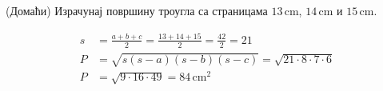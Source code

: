 \documentclass[11pt,a5paper,twoside,addpoints,answers]{exam} %
\newcommand{\measure}[2]{\mathrm{#1\,#2}}
\newcommand{\variant}[3]{#1}
\begin{document}
\begin{questions}
\question[5]
(Домаћи) Израчунај површину троугла са страницама
$\measure{\variant{13}{10}{9}}{cm}$,
$\measure{\variant{14}{15}{10}}{cm}$ и
$\measure{\variant{15}{7}{15}}{cm}$.
\begin{solution}[\stretch 5]
\begin{align*}
s &= \frac{a+b+c}{2}
= \frac{\variant{13+14+15}{10+15+7}{9+10+15}}{2}
= \frac{\variant{42}{32}{34}}{2} = \variant{21}{16}{17}
\\
P &= \sqrt{s(s-a)(s-b)(s-c)} = \sqrt{\variant
	{21\cdot 8\cdot 7\cdot 6}
	{16\cdot 6\cdot 1\cdot 9}
	{17\cdot 8\cdot 7\cdot 2}}
\\
P &= \sqrt{\variant
	{9\cdot 16\cdot 49}
	{16\cdot 9\cdot 6}
	{17\cdot 7\cdot 8\cdot 2}}
= \measure{\variant{84}{12\sqrt{6}}{4\sqrt{119}}}{cm^2}
\end{align*}
\end{solution}

\end{questions}
\end{document}
